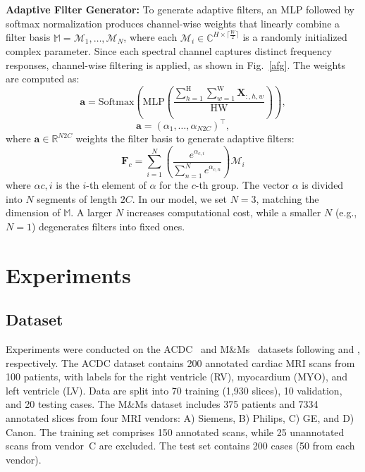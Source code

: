 \documentclass[conference]{IEEEtran}
\begin{document}
\textbf{Adaptive Filter Generator:}
To generate adaptive filters, an MLP followed by softmax normalization produces channel-wise weights that linearly combine a filter basis $\mathbb{M}={\mathcal{M}_1,\ldots,\mathcal{M}_N}$, where each $\mathcal{M}_i\in\mathbb{C}^{H\times\lceil\frac W2\rceil}$ is a randomly initialized complex parameter. Since each spectral channel captures distinct frequency responses, channel-wise filtering is applied, as shown in Fig.~\ref{afg}. The weights are computed as:
\begin{equation}
\mathbf{a}=\text{Softmax}\left(\text{MLP}\left(\frac{\sum_{h=1}^{\text{H}}\sum_{w=1}^{\text{W}} \mathbf{X}_{:,h,w}}{{\text{H}}{\text{W}}}\right)\right),
\end{equation}
\begin{equation}
\mathbf{a}=(\alpha_1,\ldots,\alpha_{N2C})^{\top},
\end{equation}
where $\mathbf{a}\in \mathbb{R}^{N2C}$ weights the filter basis to generate adaptive filters:
\begin{equation}
 \mathbf{F}_c = \sum_{i=1}^{N} \left( \frac{e^{\alpha_{c,i}}}{\sum_{n=1}^{N} e^{\alpha_{c,n}}} \right) \mathcal{M}_i
\end{equation}
where $\alpha{c,i}$ is the $i$-th element of $\alpha$ for the $c$-th group. The vector $\alpha$ is divided into $N$ segments of length $2C$. In our model, we set $N=3$, matching the dimension of $\mathbb{M}$. A larger $N$ increases computational cost, while a smaller $N$ (e.g., $N=1$) degenerates filters into fixed ones.



\section{Experiments}
\subsection{Dataset}
Experiments were conducted on the ACDC~\cite{DeepLearningTechniques2018} and M\&Ms~\cite{MulticentreMultivendorMultidisease2021} datasets following  \cite{MambaUNetUNetPureVisual2024} and \cite{UTNetHybridTransformer2021}, respectively. The ACDC dataset contains 200 annotated cardiac MRI scans from 100 patients, with labels for the right ventricle (RV), myocardium (MYO), and left ventricle (LV). Data are split into 70 training (1{,}930 slices), 10 validation, and 20 testing cases.
The M\&Ms dataset includes 375 patients and 7334 annotated slices from four MRI vendors: A) Siemens, B) Philips, C) GE, and D) Canon. The training set comprises 150 annotated scans, while 25 unannotated scans from vendor~C are excluded. The test set contains 200 cases (50 from each vendor).
\end{document}
